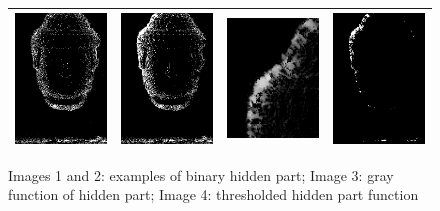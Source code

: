 \begin{figure}
\begin{tabular}{||c|c|c|c||}
   \hline \hline
   \includegraphics[width=40mm]{FIGS/Boudhas/MASQ_BRUTE_5588.jpg}  &
   \includegraphics[width=40mm]{FIGS/Boudhas/MASQ_BRUTE_5592.jpg}  &
   \includegraphics[width=40mm]{FIGS/Boudhas/MASQ_GRAY_5592.jpg}  &
   \includegraphics[width=40mm]{FIGS/Boudhas/MASQ_SEUIl_5592.jpg}  \\ \hline  \hline
\end{tabular}
\caption{Images 1 and 2: examples of binary hidden part; Image 3: gray function of hidden part; Image 4: thresholded
hidden part function}
\label{Hidden:part}
\end{figure}


